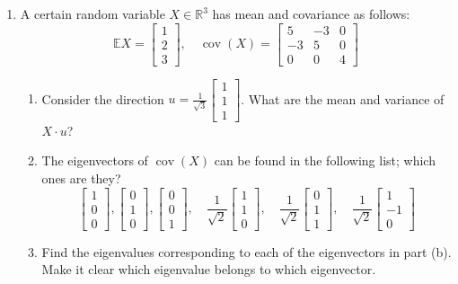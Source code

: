 \documentclass{article}
\begin{document}
\begin{enumerate}
\item A certain random variable $X \in \mathbb{R}^{3}$ has mean and covariance as follows:
    \[
    \mathbb{E} X = \begin{bmatrix}1 \\ 2 \\ 3\end{bmatrix}, \quad \operatorname{cov}(X) = \begin{bmatrix}
    5 & -3 & 0 \\
    -3 & 5 & 0 \\
    0 & 0 & 4
    \end{bmatrix}
    \]
    \begin{enumerate}
    \item Consider the direction $u = \frac{1}{\sqrt{3}}\begin{bmatrix}1 \\ 1 \\ 1\end{bmatrix}$. What are the mean and variance of $X \cdot u$?
    \item The eigenvectors of $\operatorname{cov}(X)$ can be found in the following list; which ones are they?
        \[
        \begin{bmatrix}1 \\ 0 \\ 0\end{bmatrix}, \begin{bmatrix}0 \\ 1 \\ 0\end{bmatrix}, \begin{bmatrix}0 \\ 0 \\ 1\end{bmatrix}, \quad \frac{1}{\sqrt{2}}\begin{bmatrix}1 \\ 1 \\ 0\end{bmatrix}, \quad \frac{1}{\sqrt{2}}\begin{bmatrix}0 \\ 1 \\ 1\end{bmatrix}, \quad \frac{1}{\sqrt{2}}\begin{bmatrix}1 \\ -1 \\ 0\end{bmatrix}
        \]
    \item Find the eigenvalues corresponding to each of the eigenvectors in part (b). Make it clear which eigenvalue belongs to which eigenvector.

\end{enumerate}
\end{enumerate}
\end{document}
